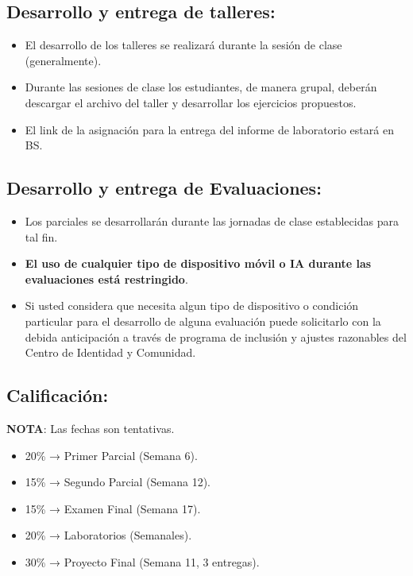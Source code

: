 \documentclass[11pt]{article}
\begin{document}
\subsection{Desarrollo y entrega de talleres:}\label{desarrollo-y-entrega-de-talleres}
\begin{itemize}
\item El desarrollo de los talleres se realizará durante la sesión de clase  (generalmente).
\item Durante las sesiones de clase los estudiantes, de manera grupal, deberán descargar el archivo del taller y desarrollar los ejercicios propuestos.
\item El link de la asignación para la entrega del informe de laboratorio estará en BS.
\end{itemize}

\subsection{Desarrollo y entrega de Evaluaciones:}\label{desarrollo-y-entrega-de-evaluaciones}
\begin{itemize}
\item Los parciales se desarrollarán durante las jornadas de clase establecidas para tal fin.
\item \textbf{El uso de cualquier tipo de dispositivo móvil o IA durante las evaluaciones está restringido}.
\item Si usted considera que necesita algun tipo de dispositivo o condición particular para el desarrollo de alguna evaluación puede solicitarlo con la debida anticipación a través de programa de inclusión y ajustes razonables del Centro de Identidad y Comunidad.
\end{itemize}

\subsection{Calificación:}\label{calificacion}
\textbf{NOTA}: Las fechas son tentativas.
\begin{itemize}
        \item 20\% → Primer Parcial (Semana 6).
        \item 15\% → Segundo Parcial (Semana 12).
        \item 15\% → Examen Final (Semana 17).
        \item 20\% → Laboratorios (Semanales).
        \item 30\% → Proyecto Final (Semana 11, 3 entregas).
\end{itemize}
\end{document}
